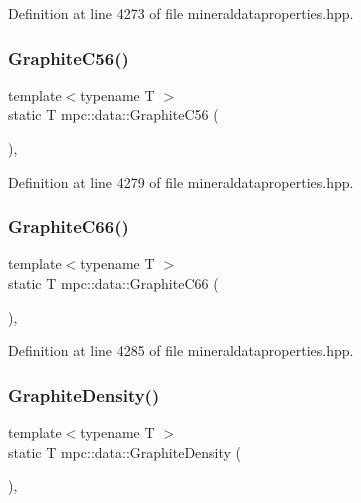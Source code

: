 Definition at line 4273 of file mineraldataproperties.\+hpp.

\mbox{\label{namespacempc_1_1data_ade41aa92d29cc38b604c6981e5639ff9}} 
\subsubsection{\texorpdfstring{Graphite\+C56()}{GraphiteC56()}}
{\footnotesize\ttfamily template$<$typename T $>$ \\
static T mpc\+::data\+::\+Graphite\+C56 (\begin{DoxyParamCaption}{ }\end{DoxyParamCaption})\hspace{0.3cm}{\ttfamily [inline]}, {\ttfamily [static]}}



Definition at line 4279 of file mineraldataproperties.\+hpp.

\mbox{\label{namespacempc_1_1data_a74e2b98f265fc9facd0c9c23074e4dc0}} 
\subsubsection{\texorpdfstring{Graphite\+C66()}{GraphiteC66()}}
{\footnotesize\ttfamily template$<$typename T $>$ \\
static T mpc\+::data\+::\+Graphite\+C66 (\begin{DoxyParamCaption}{ }\end{DoxyParamCaption})\hspace{0.3cm}{\ttfamily [inline]}, {\ttfamily [static]}}



Definition at line 4285 of file mineraldataproperties.\+hpp.

\mbox{\label{namespacempc_1_1data_ac449d0b5afb00453a45d66d9acdffc93}} 
\subsubsection{\texorpdfstring{Graphite\+Density()}{GraphiteDensity()}}
{\footnotesize\ttfamily template$<$typename T $>$ \\
static T mpc\+::data\+::\+Graphite\+Density (\begin{DoxyParamCaption}{ }\end{DoxyParamCaption})\hspace{0.3cm}{\ttfamily [inline]}, {\ttfamily [static]}}



